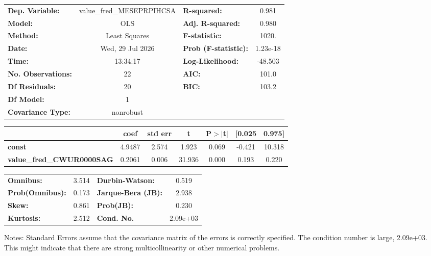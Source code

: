 \begin{center}
\begin{tabular}{lclc}
\toprule
\textbf{Dep. Variable:}           & value\_fred\_MESEPRPIHCSA & \textbf{  R-squared:         } &     0.981   \\
\textbf{Model:}                   &            OLS            & \textbf{  Adj. R-squared:    } &     0.980   \\
\textbf{Method:}                  &       Least Squares       & \textbf{  F-statistic:       } &     1020.   \\
\textbf{Date:}                    &      Wed, 29 Jul 2026     & \textbf{  Prob (F-statistic):} &  1.23e-18   \\
\textbf{Time:}                    &          13:34:17         & \textbf{  Log-Likelihood:    } &   -48.503   \\
\textbf{No. Observations:}        &               22          & \textbf{  AIC:               } &     101.0   \\
\textbf{Df Residuals:}            &               20          & \textbf{  BIC:               } &     103.2   \\
\textbf{Df Model:}                &                1          & \textbf{                     } &             \\
\textbf{Covariance Type:}         &         nonrobust         & \textbf{                     } &             \\
\bottomrule
\end{tabular}
\begin{tabular}{lcccccc}
                                  & \textbf{coef} & \textbf{std err} & \textbf{t} & \textbf{P$> |$t$|$} & \textbf{[0.025} & \textbf{0.975]}  \\
\midrule
\textbf{const}                    &       4.9487  &        2.574     &     1.923  &         0.069        &       -0.421    &       10.318     \\
\textbf{value\_fred\_CWUR0000SAG} &       0.2061  &        0.006     &    31.936  &         0.000        &        0.193    &        0.220     \\
\bottomrule
\end{tabular}
\begin{tabular}{lclc}
\textbf{Omnibus:}       &  3.514 & \textbf{  Durbin-Watson:     } &    0.519  \\
\textbf{Prob(Omnibus):} &  0.173 & \textbf{  Jarque-Bera (JB):  } &    2.938  \\
\textbf{Skew:}          &  0.861 & \textbf{  Prob(JB):          } &    0.230  \\
\textbf{Kurtosis:}      &  2.512 & \textbf{  Cond. No.          } & 2.09e+03  \\
\bottomrule
\end{tabular}
\end{center}

Notes: \newline
 [1] Standard Errors assume that the covariance matrix of the errors is correctly specified. \newline
 [2] The condition number is large, 2.09e+03. This might indicate that there are \newline
 strong multicollinearity or other numerical problems.